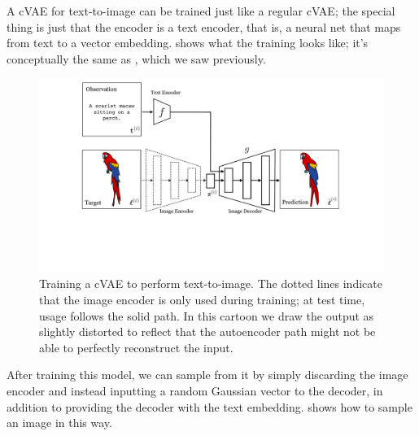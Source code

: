 A cVAE for text-to-image can be trained just like a regular cVAE; the special thing is just that the encoder is a text encoder, that is, a neural net that maps from text to a vector embedding. \Fig{\ref{fig:vision_and_language:text2im_VAE_training}} shows what the training looks like; it's conceptually the same as \fig{\ref{fig:conditional_generative_models:cVAE_ball_bouncing_example_nets}}, which we saw previously.
\begin{figure}[h!]
    \centerline{
        \includegraphics[width=1.0\linewidth]{./figures/vision_and_language/text2im_VAE_training.pdf}
    }
    \caption{Training a cVAE to perform text-to-image. The dotted lines indicate that the image encoder is only used during training; at test time, usage follows the solid path. In this cartoon we draw the output as slightly distorted to reflect that the autoencoder path might not be able to perfectly reconstruct the input.}
    \label{fig:vision_and_language:text2im_VAE_training}
\end{figure}

After training this model, we can sample from it by simply discarding the image encoder and instead inputting a random Gaussian vector to the decoder, in addition to providing the decoder with the text embedding. \Fig{\ref{fig:vision_and_language:text2im_VAE_sampling}} shows how to sample an image in this way.

